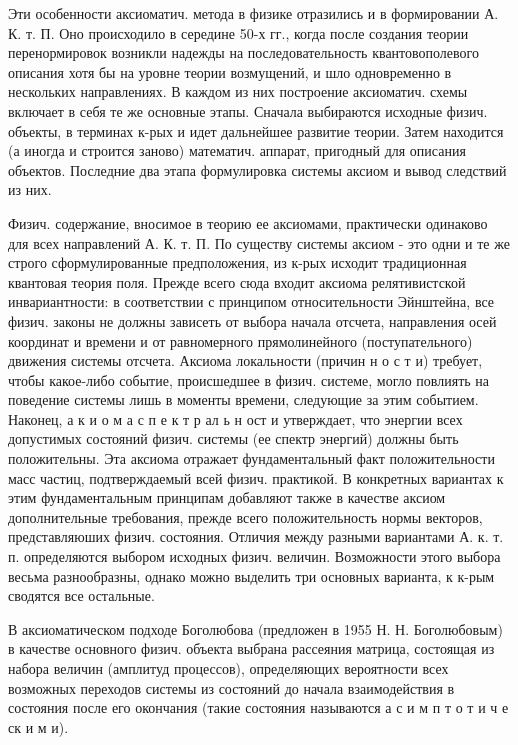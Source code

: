 \documentclass[10pt]{article}
\begin{document}
Эти особенности аксиоматич. метода в физике отразились и в формировании А. К. т. П. Оно происходило в середине 50-х гг., когда после создания теории перенормировок возникли надежды на последовательность квантовополевого описания хотя бы на уровне теории возмущений, и шло одновременно в нескольких направлениях. В каждом из них построение аксиоматич. схемы включает в себя те же основные этапы. Сначала выбираются исходные физич. объекты, в терминах к-рых и идет дальнейшее развитие теории. Затем находится (а иногда и строится заново) математич. аппарат, пригодный для описания объектов. Последние два этапа формулировка системы аксиом и вывод следствий из них.



Физич. содержание, вносимое в теорию ее аксиомами, практически одинаково для всех направлений А. К. т. П. По существу системы аксиом - это одни и те же строго сформулированные предположения, из к-рых исходит традиционная квантовая теория поля. Прежде всего сюда входит аксиома релятивистской инвариантности: в соответствии с принципом относительности Эйнштейна, все физич. законы не должны зависеть от выбора начала отсчета, направления осей координат и времени и от равномерного прямолинейного (поступательного) движения системы отсчета. Аксиома локальности (причин н о с т и) требует, чтобы какое-либо событие, происшедшее в физич. системе, могло повлиять на поведение системы лишь в моменты времени, следующие за этим событием. Наконец, а к и о м а с п е к т р ал ь н ост и утверждает, что энергии всех допустимых состояний физич. системы (ее спектр энергий) должны быть положительны. Эта аксиома отражает фундаментальный факт положительности масс частиц, подтверждаемый всей физич. практикой. В конкретных вариантах к этим фундаментальным принципам добавляют также в качестве аксиом дополнительные требования, прежде всего положительность нормы векторов, представляюших физич. состояния. Отличия между разными вариантами А. к. т. п. определяются выбором исходных физич. величин. Возможности этого выбора весьма разнообразны, однако можно выделить три основных варианта, к к-рым сводятся все остальные.



В аксиоматическом подходе Боголюбова (предложен в 1955 Н. Н. Боголюбовым) в качестве основного физич. объекта выбрана рассеяния матрица, состоящая из набора величин (амплитуд процессов), определяющих вероятности всех возможных переходов системы из состояний до начала взаимодействия в состояния после его окончания (такие состояния называются а с и м п т о т и ч е ск и м и).
\end{document}
